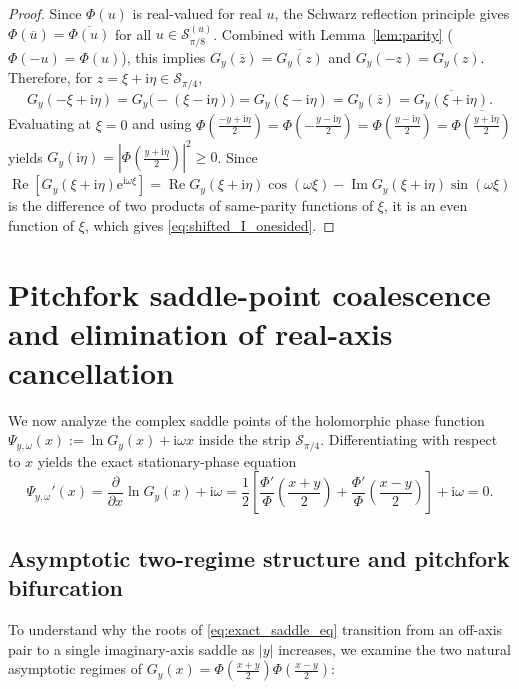 \documentclass[11pt,a4paper,reqno]{amsart}
\theoremstyle{definition}
\theoremstyle{remark}
\numberwithin{equation}{section}
\newcommand{\ii}{\mathrm{i}}
\newcommand{\ee}{\mathrm{e}}
\newcommand{\Rea}{\operatorname{Re}}
\newcommand{\Ima}{\operatorname{Im}}
\begin{document}
\begin{proof}
Since $\Phi(u)$ is real-valued for real $u$, the Schwarz reflection principle gives $\Phi(\overline{u}) = \overline{\Phi(u)}$ for all $u \in \mathcal{S}_{\pi/8}^{(u)}$. Combined with Lemma~\ref{lem:parity} ($\Phi(-u) = \Phi(u)$), this implies $G_y(\overline{z}) = \overline{G_y(z)}$ and $G_y(-z) = G_y(z)$. Therefore, for $z = \xi + \ii\eta \in \mathcal{S}_{\pi/4}$,
\[
G_y(-\xi + \ii\eta) = G_y\big(-(\xi - \ii\eta)\big) = G_y(\xi - \ii\eta) = G_y(\overline{z}) = \overline{G_y(\xi + \ii\eta)}.
\]
Evaluating at $\xi = 0$ and using $\Phi(\frac{-y+\ii\eta}{2}) = \Phi(-\frac{y-\ii\eta}{2}) = \Phi(\frac{y-\ii\eta}{2}) = \overline{\Phi(\frac{y+\ii\eta}{2})}$ yields $G_y(\ii\eta) = |\Phi(\frac{y+\ii\eta}{2})|^2 \ge 0$. Since $\Rea[G_y(\xi+\ii\eta)\ee^{\ii\omega\xi}] = \Rea G_y(\xi+\ii\eta)\cos(\omega\xi) - \Ima G_y(\xi+\ii\eta)\sin(\omega\xi)$ is the difference of two products of same-parity functions of $\xi$, it is an even function of $\xi$, which gives \eqref{eq:shifted_I_onesided}.
\end{proof}

\section{Pitchfork saddle-point coalescence and elimination of real-axis cancellation}\label{sec:saddle}

We now analyze the complex saddle points of the holomorphic phase function $\Psi_{y,\omega}(x) := \ln G_y(x) + \ii\omega x$ inside the strip $\mathcal{S}_{\pi/4}$. Differentiating with respect to $x$ yields the exact stationary-phase equation
\begin{equation}\label{eq:exact_saddle_eq}
\Psi_{y,\omega}'(x) = \frac{\partial}{\partial x}\ln G_y(x) + \ii\omega = \frac{1}{2}\left[\frac{\Phi'}{\Phi}\!\left(\frac{x+y}{2}\right) + \frac{\Phi'}{\Phi}\!\left(\frac{x-y}{2}\right)\right] + \ii\omega = 0.
\end{equation}

\subsection{Asymptotic two-regime structure and pitchfork bifurcation}\label{subsec:pitchfork}

To understand why the roots of \eqref{eq:exact_saddle_eq} transition from an off-axis pair to a single imaginary-axis saddle as $|y|$ increases, we examine the two natural asymptotic regimes of $G_y(x) = \Phi(\frac{x+y}{2})\Phi(\frac{x-y}{2})$:
\end{document}
